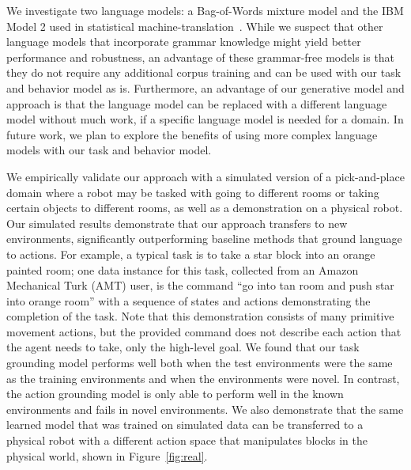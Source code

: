 \documentclass[conference]{IEEEtran}
\begin{document}
We investigate two language models: a Bag-of-Words mixture model and
the IBM Model 2 used in statistical machine-translation~\cite{brown90,brown93}. While we suspect that other language
models that incorporate grammar knowledge might yield better
performance and robustness, an advantage of these grammar-free models
is that they do not require any additional corpus training and can be
used with our task and behavior model as is. Furthermore, an advantage
of our generative model and approach is that the language model can be
replaced with a different language model without much work, if a
specific language model is needed for a domain. In future work, we
plan to explore the benefits of using more complex language models
with our task and behavior model.

We empirically validate our approach with a simulated version of a
pick-and-place domain where a robot may be tasked with going to
different rooms or taking certain objects to different rooms, as well
as a demonstration on a physical robot.  Our simulated results
demonstrate that our approach transfers to new environments,
significantly outperforming baseline methods that ground language to
actions.  For example, a typical task is to take a star block into an
orange painted room; one data instance for this task, collected from
an Amazon Mechanical Turk (AMT) user, is the command ``go into tan
room and push star into orange room'' with a sequence of states and
actions demonstrating the completion of the task. Note that this
demonstration consists of many primitive movement actions, but the
provided command does not describe each action that the agent needs to
take, only the high-level goal.  We found that our task grounding
model performs well both when the test environments were the same as
the training environments and when the environments were novel. In
contrast, the action grounding model is only able to perform well in
the known environments and fails in novel environments.  We also
demonstrate that the same learned model that was trained on simulated
data can be transferred to a physical robot with a different action
space that manipulates blocks in the physical world, shown in
Figure~\ref{fig:real}.


\end{document}
